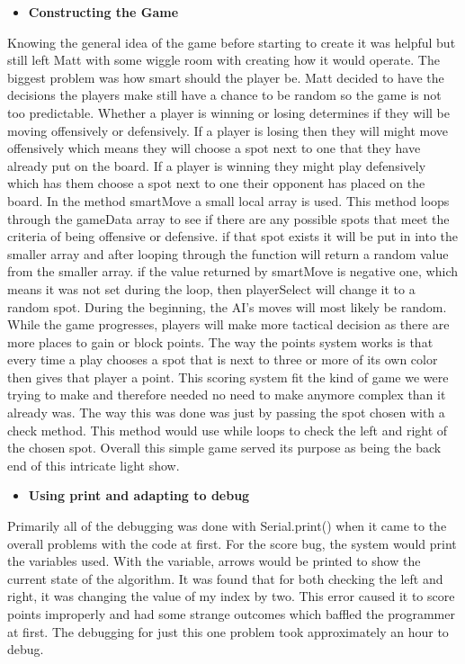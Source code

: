 \documentclass[twoside]{article}
\begin{document}
\begin{itemize}
    \item\textbf{Constructing the Game} 
\end{itemize}
\text Knowing the general idea of the game before starting to create it was helpful but still left Matt with some wiggle room with creating how it would operate. The biggest problem was how smart should the player be. Matt decided to have the decisions the players make still have a chance to be random so the game is not too predictable. Whether a player is winning or losing determines if they will be moving offensively or defensively. If a player is losing then they will might move offensively which means they will choose a spot next to one that they have already put on the board. If a player is winning they might play defensively which has them choose a spot next to one their opponent has placed on the board. In the method smartMove a small local array is used. This method loops through the gameData array to see if there are any possible spots that meet the criteria of being offensive or defensive. if that spot exists it will be put in into the smaller array and after looping through the function will return a random value from the smaller array. if the value returned by smartMove is negative one, which means it was not set during the loop, then playerSelect will change it to a random spot. During the beginning, the AI's moves will most likely be random. While the game progresses, players will make more tactical decision as there are more places to gain or block points. The way the points system works is that every time a play chooses a spot that is next to three or more of its own color then gives that player a point. This scoring system fit the kind of game we were trying to make and therefore needed no need to make anymore complex than it already was. The way this was done was just by passing the spot chosen with a check method. This method would use while loops to check the left and right of the chosen spot. Overall this simple game served its purpose as being the back end of this intricate light show.  

\begin{itemize}
    \item\textbf{Using print and adapting to debug}
\end{itemize}
\text Primarily all of the debugging was done with Serial.print() when it came to the overall problems with the code at first. For the score bug, the system would print the variables used. With the variable, arrows would be printed to show the current state of the algorithm. It was found that for both checking the left and right, it was changing the value of my index by two. This error caused it to score points improperly and had some strange outcomes which baffled the programmer at first. The debugging for just this one problem took approximately an hour to debug. 
\end{document}
